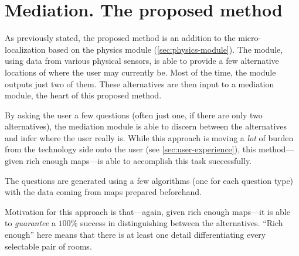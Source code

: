 \section{Mediation. The proposed method}
\label{sec:mediation}

As previously stated, the proposed method is an addition to the micro-localization based on the physics module (\cref{sec:physics-module}). The module, using data from various physical sensors, is able to provide a few alternative locations of where the user may currently be. Most of the time, the module outputs just two of them. These alternatives are then input to a mediation module, the heart of this proposed method.

By asking the user a few questions (often just one, if there are only two alternatives), the mediation module is able to discern between the alternatives and infer where the user really is. While this approach is moving a \emph{lot} of burden from the technology side onto the user (see \cref{sec:user-experience}), this method---given rich enough maps---is able to accomplish this task successfully.

The questions are generated using a few algorithms (one for each question type) with the data coming from maps prepared beforehand.

Motivation for this approach is that---again, given rich enough maps---it is able to \emph{guarantee} a $100\%$ success in distinguishing between the alternatives. ``Rich enough'' here means that there is at least one detail differentiating every selectable pair of rooms.
